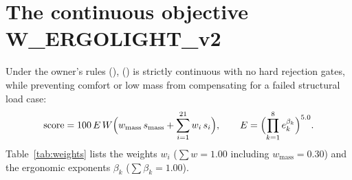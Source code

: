 \section{The continuous objective W\_ERGOLIGHT\_v2}\label{sec:objective}
Under the owner's rules (),  ()
is strictly continuous with no hard rejection gates, while preventing comfort or low mass from compensating for a failed
structural load case:
\begin{equation}\label{eq:scorev2}
\mathrm{score} = 100\,E\,W \Bigl(w_\mathrm{mass}\,s_\mathrm{mass} + \sum_{i=1}^{21} w_i\,s_i\Bigr),
\qquad E = \Bigl(\prod_{k=1}^{8} e_k^{\beta_k}\Bigr)^{5.0}.
\end{equation}
Table~\ref{tab:weights} lists the weights $w_i$ ($\sum w = 1.00$ including $w_\mathrm{mass} = 0.30$) and the ergonomic
exponents $\beta_k$ ($\sum \beta_k = 1.00$).

